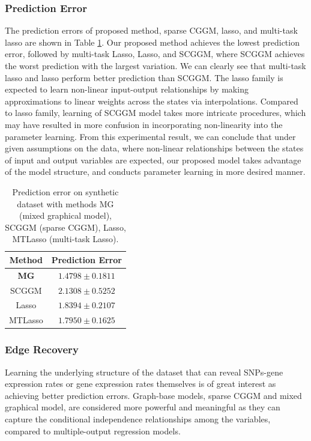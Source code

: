 \documentclass{article}
\begin{document}
 
 
 
 

\subsubsection{Prediction Error}

The prediction errors of proposed method, sparse CGGM, lasso, and multi-task lasso are shown in Table \ref{table:syn_pred_err}.
Our proposed method achieves the lowest prediction error, followed by multi-task Lasso, Lasso, and SCGGM, where SCGGM achieves the worst prediction with the largest variation.
We can clearly see that multi-task lasso and lasso perform better prediction than SCGGM.
The lasso family is expected to learn non-linear input-output relationships by making approximations to linear weights across the states via interpolations.
Compared to lasso family, learning of SCGGM model takes more intricate procedures, which may have resulted in more confusion in incorporating non-linearity into the parameter learning.
From this experimental result, we can conclude that under given assumptions on the data, where non-linear relationships between the states of input and output variables are expected, our proposed model takes advantage of the model structure, and conducts parameter learning in more desired manner.



 
\begin{table}[hbtp]
\begin{center}
    \begin{tabular}{| c | c |}
    \hline
    Method & Prediction Error \\
    \hline
    \textbf{MG} & $\mathbf{1.4798 \pm 0.1811}$ \\
    SCGGM & $2.1308 \pm 0.5252$  \\
    Lasso & $1.8394 \pm 0.2107$  \\
    MTLasso & $1.7950 \pm 0.1625$ \\
    \hline 
    \end{tabular}
\end{center}
 	\caption{Prediction error on synthetic dataset with methods MG (mixed graphical model), SCGGM (sparse CGGM), Lasso, MTLasso (multi-task Lasso).}
 \label{table:syn_pred_err}
\end{table}



\subsubsection{Edge Recovery}
Learning the underlying structure of the dataset that can reveal SNPs-gene expression rates or gene expression rates themselves is of great interest as achieving better prediction errors. Graph-base models, sparse CGGM and mixed graphical model, are considered more powerful and meaningful as they can capture the conditional independence relationships among the variables, compared to multiple-output regression models.
\end{document}
